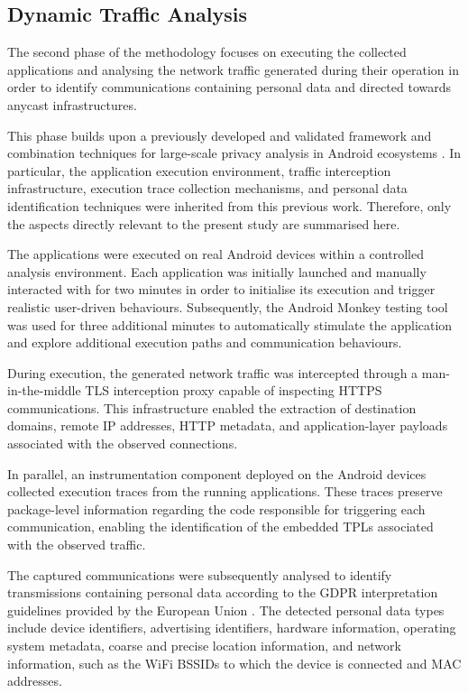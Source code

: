 \subsection{Dynamic Traffic Analysis}
\label{sc:anycast_experiments_traffic_collection}

The second phase of the methodology focuses on executing the collected applications and analysing the network traffic generated during their operation in order to identify communications containing personal data and directed towards anycast infrastructures.

This phase builds upon a previously developed and validated framework and combination techniques for large-scale privacy analysis in Android ecosystems \cite{Guaman2023AutomatedApplications}. In particular, the application execution environment, traffic interception infrastructure, execution trace collection mechanisms, and personal data identification techniques were inherited from this previous work. Therefore, only the aspects directly relevant to the present study are summarised here.

The applications were executed on real Android devices within a controlled analysis environment. Each application was initially launched and manually interacted with for two minutes in order to initialise its execution and trigger realistic user-driven behaviours. Subsequently, the Android Monkey testing tool \cite{IUDevelopers} was used for three additional minutes to automatically stimulate the application and explore additional execution paths and communication behaviours.

During execution, the generated network traffic was intercepted through a man-in-the-middle TLS interception proxy capable of inspecting HTTPS communications. This infrastructure enabled the extraction of destination domains, remote IP addresses, HTTP metadata, and application-layer payloads associated with the observed connections.

In parallel, an instrumentation component deployed on the Android devices collected execution traces from the running applications. These traces preserve package-level information regarding the code responsible for triggering each communication, enabling the identification of the embedded TPLs associated with the observed traffic.

The captured communications were subsequently analysed to identify transmissions containing personal data according to the GDPR interpretation guidelines provided by the European Union \cite{JUSTICEwp260rev.01}. The detected personal data types include device identifiers, advertising identifiers, hardware information, operating system metadata, coarse and precise location information, and network information, such as the WiFi BSSIDs to which the device is connected and MAC addresses.

